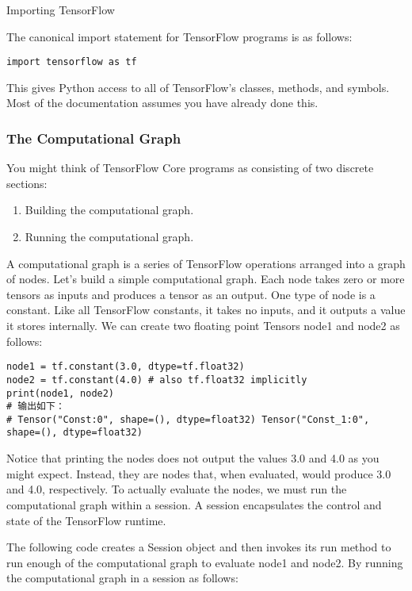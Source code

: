 Importing TensorFlow

The canonical import statement for TensorFlow programs is as follows:

\begin{verbatim}
import tensorflow as tf
\end{verbatim}

This gives Python access to all of TensorFlow's classes, methods, and symbols. Most of the documentation assumes you have already done this.

\subsubsection{The Computational Graph}
You might think of TensorFlow Core programs as consisting of two discrete sections:

\begin{enumerate}
\item Building the computational graph.
\item Running the computational graph.
\end{enumerate}

A computational graph is a series of TensorFlow operations arranged into a graph of nodes. Let's build a simple computational graph. Each node takes zero or more tensors as inputs and produces a tensor as an output. One type of node is a constant. Like all TensorFlow constants, it takes no inputs, and it outputs a value it stores internally. We can create two floating point Tensors node1 and node2 as follows:

\begin{verbatim}
node1 = tf.constant(3.0, dtype=tf.float32)
node2 = tf.constant(4.0) # also tf.float32 implicitly
print(node1, node2)
# 输出如下：
# Tensor("Const:0", shape=(), dtype=float32) Tensor("Const_1:0", shape=(), dtype=float32)
\end{verbatim}

Notice that printing the nodes does not output the values 3.0 and 4.0 as you might expect. Instead, they are nodes that, when evaluated, would produce 3.0 and 4.0, respectively. To actually evaluate the nodes, we must run the computational graph within a session. A session encapsulates the control and state of the TensorFlow runtime.

The following code creates a Session object and then invokes its run method to run enough of the computational graph to evaluate node1 and node2. By running the computational graph in a session as follows:

